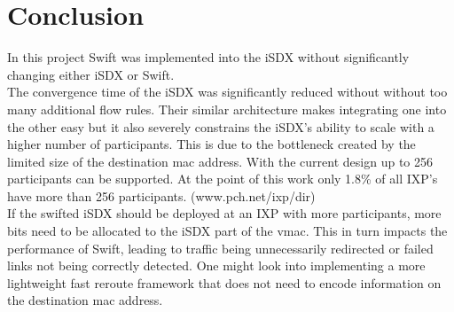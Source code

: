 \chapter{\label{chapter5}Conclusion}
In this project Swift was implemented into the iSDX without significantly changing either iSDX or Swift. \\
The convergence time of the iSDX was significantly reduced without without too many additional flow rules. Their similar architecture makes integrating one into the other easy but it also severely constrains the iSDX's ability to scale with a higher number of participants. This is due to the bottleneck created by the limited size of the destination mac address. With the current design up to 256 participants can be supported. At the point of this work only 1.8\% of all IXP's have more than 256 participants. (www.pch.net/ixp/dir) \\
If the swifted iSDX should be deployed at an IXP with more participants, more bits need to be allocated to the iSDX part of the vmac. This in turn impacts the performance of Swift, leading to traffic being unnecessarily redirected or failed links not being correctly detected. One might look into implementing a more lightweight fast reroute framework that does not need to encode information on the destination mac address.
